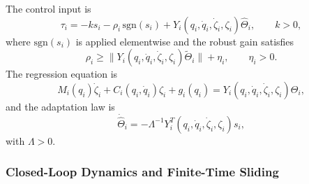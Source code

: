 The control input is
\begin{equation}\label{eq5:control_input}
	\tau_i = -k s_i - \rho_i\,\mathrm{sgn}(s_i)
	+ Y_i(q_i,\dot{q}_i,\dot{\zeta}_i,\zeta_i) \hat{\Theta}_i,\qquad k>0,
\end{equation}
where $\mathrm{sgn}(s_i)$ is applied elementwise and the robust gain satisfies
\begin{equation}\label{eq5:rho}
	\rho_i \ge \bigl\|Y_i(q_i,\dot{q}_i,\dot{\zeta}_i,\zeta_i)\tilde{\Theta}_i\bigr\| + \eta_i,
	\qquad \eta_i > 0.
\end{equation}
The regression equation is
\begin{equation}\label{eq5:regression}
	M_i(q_i)\dot{\zeta}_i + C_i(q_i,\dot{q}_i)\zeta_i + g_i(q_i)
	= Y_i(q_i,\dot{q}_i,\dot{\zeta}_i,\zeta_i)\Theta_i,
\end{equation}
and the adaptation law is
\begin{equation}\label{eq5:adaptation}
	\dot{\hat{\Theta}}_i = -\Lambda^{-1} Y_i^T(q_i,\dot{q}_i,\dot{\zeta}_i,\zeta_i) s_i,
\end{equation}
with $\Lambda > 0$.

\subsubsection{Closed-Loop Dynamics and Finite-Time Sliding}


